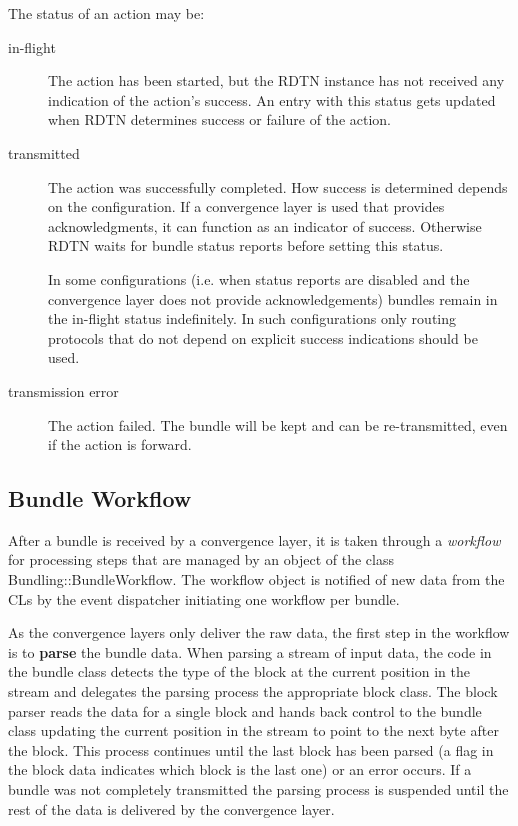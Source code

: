 \documentclass{article}
\begin{document}
The status of an action may be:
\begin{description}

\item[in-flight] The action has been started, but the RDTN instance has not
received any indication of the action's success. An entry with this status gets
updated when RDTN determines success or failure of the action.

\item[transmitted] The action was successfully completed. How success is
determined depends on the configuration. If a convergence layer is used that
provides acknowledgments, it can function as an indicator of success. Otherwise
RDTN waits for bundle status reports before setting this status.

In some configurations (i.e. when status reports are disabled and the
convergence layer does not provide acknowledgements) bundles remain in the
in-flight status indefinitely. In such configurations only routing protocols
that do not depend on explicit success indications should be used.

\item[transmission error] The action failed. The bundle will be kept and can be
re-transmitted, even if the action is forward.

\end{description}

\subsection{Bundle Workflow}\label{sec.workflow}

After a bundle is received by a convergence layer, it is taken through a
{\em workflow} for processing steps that are managed by an object of the class
Bundling::BundleWorkflow. The workflow object is notified of new data from the
CLs by the event dispatcher initiating one workflow per bundle.

As the convergence layers only deliver the raw data, the first step in the
workflow is to {\bf parse} the bundle data.  When parsing a stream of input
data, the code in the bundle class detects the type of the block at the current
position in the stream and delegates the parsing process the appropriate block
class. The block parser reads the data for a single block and hands back control
to the bundle class updating the current position in the stream to point to the
next byte after the block. This process continues until the last block has been
parsed (a flag in the block data indicates which block is the last one) or an
error occurs. If a bundle was not completely transmitted the parsing process is
suspended until the rest of the data is delivered by the convergence layer.
\end{document}
